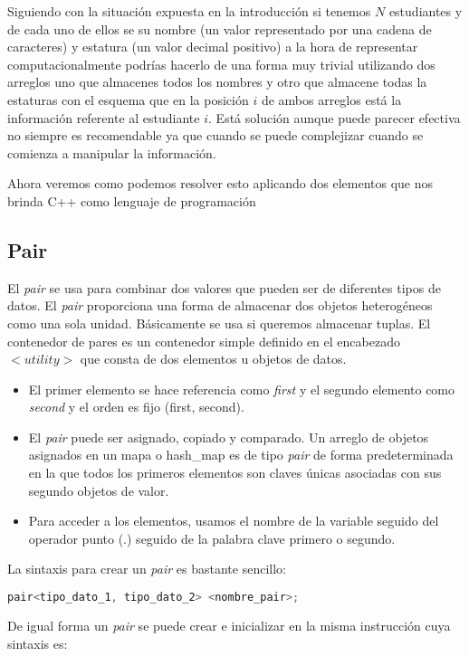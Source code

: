 Siguiendo con la situación expuesta en la introducción si tenemos $N$ estudiantes y de cada uno de ellos se su nombre (un valor representado por una cadena de caracteres) y estatura (un valor decimal positivo) a la hora de representar computacionalmente podrías hacerlo de una forma muy trivial utilizando dos arreglos uno que almacenes todos los nombres y otro que almacene todas la estaturas con el esquema que en la posición $i$ de ambos arreglos está la información referente al estudiante $i$. Está solución aunque puede parecer efectiva no siempre es recomendable ya que cuando se puede complejizar cuando se comienza a manipular la información. 

Ahora veremos como podemos resolver esto aplicando dos elementos que nos brinda C++ como lenguaje de programación

\subsection{Pair}
El \emph{pair} se usa para combinar dos valores que pueden ser de diferentes tipos de datos. El \emph{pair} proporciona una forma de almacenar dos objetos heterogéneos como una sola unidad. Básicamente se usa si queremos almacenar tuplas. El contenedor de pares es un contenedor simple definido en el encabezado $<utility>$ que consta de dos elementos u objetos de datos.

\begin{itemize}
	\item El primer elemento se hace referencia como \emph{first} y el segundo elemento como \emph{second} y el orden es fijo (first, second).
	\item El \emph{pair} puede ser asignado, copiado y comparado. Un arreglo de objetos asignados en un mapa o hash\_map es de tipo \emph{pair} de forma predeterminada en la que todos los primeros elementos son claves únicas asociadas con sus segundo objetos de valor.
	\item Para acceder a los elementos, usamos el nombre de la variable seguido del operador punto (.) seguido de la palabra clave primero o segundo.
\end{itemize}

La sintaxis para crear un \emph{pair} es bastante sencillo:

\begin{lstlisting}[language=C++]
pair<tipo_dato_1, tipo_dato_2> <nombre_pair>;
\end{lstlisting}

De igual forma un \emph{pair} se puede crear e inicializar en la misma instrucción cuya sintaxis es:

